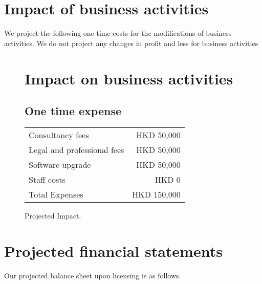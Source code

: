 \section{Impact of business activities}

We project the following one time costs for the modifications of
business activities.  We do not project any changes in profit and less
for business activities

\begin{figure}[h]
  \centering
  \caption{Projected Impact.}
  \label{fig:financial_statement}
  
  \section*{Impact on business activities}
  
  \subsection*{One time expense}
  \begin{tabular}{lr}
    Consultancy fees & HKD 50,000 \\
    Legal and professional fees & HKD 50,000 \\
    Software upgrade & HKD 50,000 \\
    Staff costs & HKD 0 \\
    \midrule
    Total Expenses & HKD 150,000 \\
  \end{tabular}
\end{figure}


\section{Projected financial statements}

Our projected balance sheet upon licensing is as follows.

